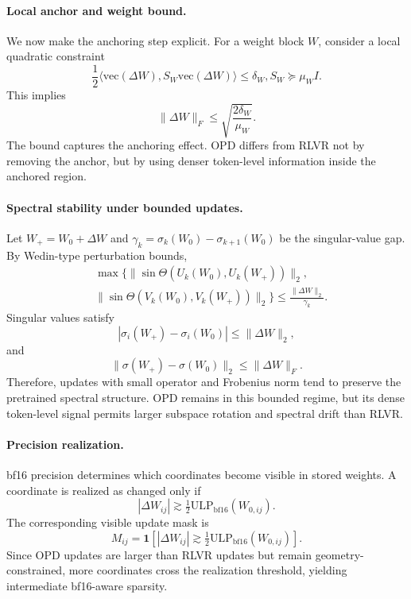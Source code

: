 \documentclass{llmxive}
\begin{document}
\paragraph{Local anchor and weight bound.}
We now make the anchoring step explicit. For a weight block $W$, consider a
local quadratic constraint
\begin{equation}
\frac{1}{2}
\langle
\mathrm{vec}(\Delta W),
S_W \mathrm{vec}(\Delta W)
\rangle
\leq
\delta_W,
S_W \succeq \mu_W I .
\end{equation}
This implies
\begin{equation}
\|\Delta W\|_F
\leq
\sqrt{\frac{2\delta_W}{\mu_W}} .
\label{eq:app_weight_bound}
\end{equation}
The bound captures the anchoring effect. OPD differs from RLVR not by removing
the anchor, but by using denser token-level information inside the anchored
region.

\paragraph{Spectral stability under bounded updates.}
Let $W_+=W_0+\Delta W$ and
$\gamma_k=\sigma_k(W_0)-\sigma_{k+1}(W_0)$ be the singular-value gap. By
Wedin-type perturbation bounds,
\begin{equation}
\begin{split}
&\max\{
\|\sin\Theta(U_k(W_0),U_k(W_+))\|_2, \\
&
\|\sin\Theta(V_k(W_0),V_k(W_+))\|_2
\}
\leq
\frac{\|\Delta W\|_2}{\gamma_k}.
\end{split}
\end{equation}
Singular values satisfy
\begin{equation}
|\sigma_i(W_+) - \sigma_i(W_0)|
\leq
\|\Delta W\|_2,
\end{equation}
and
\begin{equation}
\|\sigma(W_+) - \sigma(W_0)\|_2
\leq
\|\Delta W\|_F .
\end{equation}
Therefore, updates with small operator and Frobenius norm tend to preserve the
pretrained spectral structure. OPD remains in this bounded regime, but its
dense token-level signal permits larger subspace rotation and spectral drift
than RLVR.

\paragraph{Precision realization.}
bf16 precision determines which coordinates become visible in stored weights.
A coordinate is realized as changed only if
\begin{equation}
|\Delta W_{ij}|
\gtrsim
\tfrac{1}{2}
\mathrm{ULP}_{\mathrm{bf16}}(W_{0,ij}).
\end{equation}
The corresponding visible update mask is
\begin{equation}
M_{ij}
=
\mathbf{1}
\left[
|\Delta W_{ij}|
\gtrsim
\tfrac{1}{2}
\mathrm{ULP}_{\mathrm{bf16}}(W_{0,ij})
\right].
\end{equation}
Since OPD updates are larger than RLVR updates but remain
geometry-constrained, more coordinates cross the realization threshold,
yielding intermediate bf16-aware sparsity.
\end{document}
